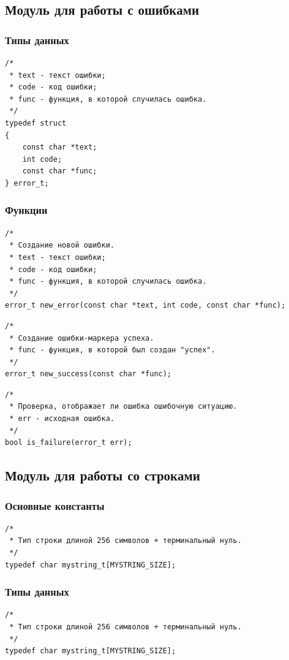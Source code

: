 \documentclass[a4paper,12pt]{extarticle}
\begin{document}
\subsection{Модуль для работы с ошибками}
\subsubsection{Типы данных}
\begin{verbatim}
/*
 * text - текст ошибки;
 * code - код ошибки;
 * func - функция, в которой случилась ошибка.
 */
typedef struct 
{
    const char *text;
    int code;
    const char *func;
} error_t;
\end{verbatim}


\subsubsection{Функции}
\begin{verbatim}
/*
 * Создание новой ошибки.
 * text - текст ошибки;
 * code - код ошибки;
 * func - функция, в которой случилась ошибка.
 */
error_t new_error(const char *text, int code, const char *func);
\end{verbatim}


\begin{verbatim}
/*
 * Создание ошибки-маркера успеха.
 * func - функция, в которой был создан "успех".
 */
error_t new_success(const char *func);
\end{verbatim}



\begin{verbatim}
/*
 * Проверка, отображает ли ошибка ошибочную ситуацию.
 * err - исходная ошибка.
 */
bool is_failure(error_t err);
\end{verbatim}


\subsection{Модуль для работы со строками}
\subsubsection{Основные константы}
\begin{verbatim}
/*
 * Тип строки длиной 256 символов + терминальный нуль.
 */
typedef char mystring_t[MYSTRING_SIZE];
\end{verbatim}


\subsubsection{Типы данных}
\begin{verbatim}
/*
 * Тип строки длиной 256 символов + терминальный нуль.
 */
typedef char mystring_t[MYSTRING_SIZE];
\end{verbatim}
\end{document}

